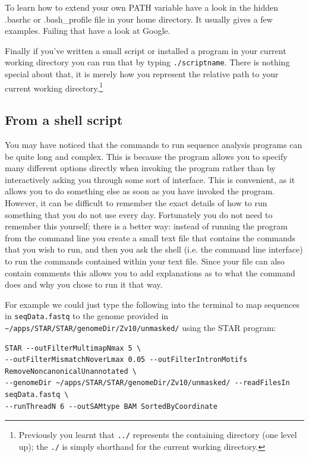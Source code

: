 \documentclass[11pt]{article}
\begin{document}
To learn how to extend your own PATH variable have a look in the hidden
.basrhc or .bash\_profile file in your home directory. It usually gives a
few examples. Failing that have a look at Google.

Finally if you've written a small script or installed a program in your
current working directory you can run that by typing \texttt{./scriptname}. There
is nothing special about that, it is merely how you represent the
relative path to your current working directory.\footnote{Previously you learnt that \texttt{../} represents the containing directory
(one level up); the \texttt{./} is simply shorthand for the current working directory.}

\subsection{From a shell script}
\label{sec:orgheadline17}
You may have noticed that the commands to run sequence analysis programs can
be quite long and complex. This is because the program allows you to specify
many different options directly when invoking the program rather than by
interactively asking you through some sort of interface. This is convenient,
as it allows you to do something else as soon as you have invoked the
program. However, it can be difficult to remember the exact details of how to
run something that you do not use every day. Fortunately you do not need to
remember this yourself; there is a better way: instead of running the program
from the command line you create a small text file that contains the commands
that you wish to run, and then you ask the shell (i.e. the command line
interface) to run the commands contained within your text file. Since your
file can also contain comments this allows you to add explanations as to what
the command does and why you chose to run it that way.

For example we could just type the following into the terminal to map
sequences in \texttt{seqData.fastq} to the genome provided in
\texttt{\textasciitilde{}/apps/STAR/STAR/genomeDir/Zv10/unmasked/}
using the STAR program:

\begin{verbatim}
STAR --outFilterMultimapNmax 5 \
--outFilterMismatchNoverLmax 0.05 --outFilterIntronMotifs RemoveNoncanonicalUnannotated \
--genomeDir ~/apps/STAR/STAR/genomeDir/Zv10/unmasked/ --readFilesIn seqData.fastq \
--runThreadN 6 --outSAMtype BAM SortedByCoordinate
\end{verbatim}
\end{document}
